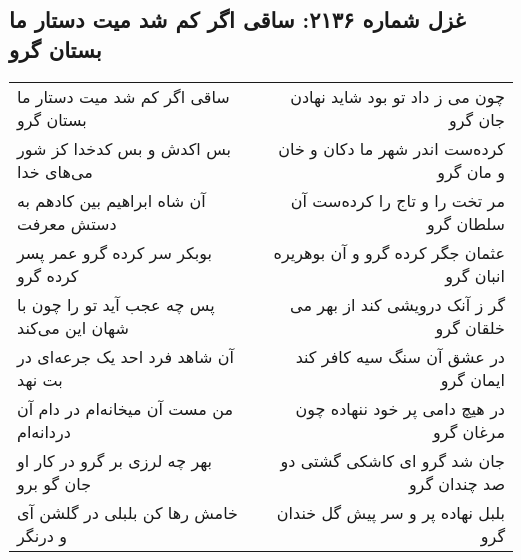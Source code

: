 \begin{center}
\section*{غزل شماره ۲۱۳۶: ساقی اگر کم شد میت دستار ما بستان گرو}
\label{sec:2136}
\begin{longtable}{l p{0.5cm} r}
ساقی اگر کم شد میت دستار ما بستان گرو
&&
چون می ز داد تو بود شاید نهادن جان گرو
\\
بس اکدش و بس کدخدا کز شور می‌های خدا
&&
کرده‌ست اندر شهر ما دکان و خان و مان گرو
\\
آن شاه ابراهیم بین کادهم به دستش معرفت
&&
مر تخت را و تاج را کرده‌ست آن سلطان گرو
\\
بوبکر سر کرده گرو عمر پسر کرده گرو
&&
عثمان جگر کرده گرو و آن بوهریره انبان گرو
\\
پس چه عجب آید تو را چون با شهان این می‌کند
&&
گر ز آنک درویشی کند از بهر می خلقان گرو
\\
آن شاهد فرد احد یک جرعه‌ای در بت نهد
&&
در عشق آن سنگ سیه کافر کند ایمان گرو
\\
من مست آن میخانه‌ام در دام آن دردانه‌ام
&&
در هیچ دامی پر خود ننهاده چون مرغان گرو
\\
بهر چه لرزی بر گرو در کار او جان گو برو
&&
جان شد گرو ای کاشکی گشتی دو صد چندان گرو
\\
خامش رها کن بلبلی در گلشن آی و درنگر
&&
بلبل نهاده پر و سر پیش گل خندان گرو
\\
\end{longtable}
\end{center}
